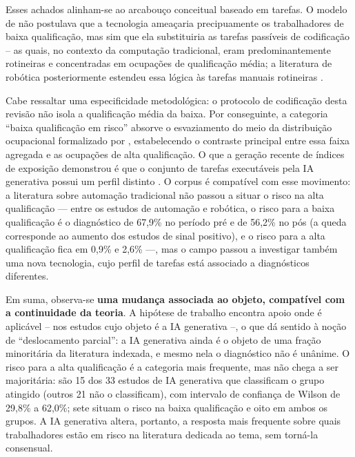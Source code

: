 \begin{table}[htbp]
\centering
\caption{Grupo de qualificação em risco segundo a tecnologia em foco no estudo.}
\label{tab:polarizacao_tecnologia}

\end{table}

Esses achados alinham-se ao arcabouço conceitual baseado em tarefas. O modelo de \textcite{autorLevyMurnane2003} não postulava que a tecnologia ameaçaria precipuamente os trabalhadores de baixa qualificação, mas sim que ela substituiria as tarefas passíveis de codificação -- as quais, no contexto da computação tradicional, eram predominantemente rotineiras e concentradas em ocupações de qualificação média; a literatura de robótica posteriormente estendeu essa lógica às tarefas manuais rotineiras \parencite{acemogluRestrepo2020robots}.

Cabe ressaltar uma especificidade metodológica: o protocolo de codificação desta revisão não isola a qualificação média da baixa. Por conseguinte, a categoria ``baixa qualificação em risco'' absorve o esvaziamento do meio da distribuição ocupacional formalizado por \textcite{autorDorn2013}, estabelecendo o contraste principal entre essa faixa agregada e as ocupações de alta qualificação. O que a geração recente de índices de exposição demonstrou é que o conjunto de tarefas executáveis pela IA generativa possui um perfil distinto \parencite{webb2020, felten2021, eloundou2024}. O corpus é compatível com esse movimento: a literatura sobre automação tradicional não passou a situar o risco na alta qualificação — entre os estudos de automação e robótica, o risco para a baixa qualificação é o diagnóstico de 67,9\% no período pré e de 56,2\% no pós (a queda corresponde ao aumento dos estudos de sinal positivo), e o risco para a alta qualificação fica em 0,9\% e 2,6\% —, mas o campo passou a investigar também uma nova tecnologia, cujo perfil de tarefas está associado a diagnósticos diferentes.

Em suma, observa-se \textbf{uma mudança associada ao objeto, compatível com a continuidade da teoria}. A hipótese de trabalho encontra apoio onde é aplicável -- nos estudos cujo objeto é a IA generativa --, o que dá sentido à noção de ``deslocamento parcial'': a IA generativa ainda é o objeto de uma fração minoritária da literatura indexada, e mesmo nela o diagnóstico não é unânime. O risco para a alta qualificação é a categoria mais frequente, mas não chega a ser majoritária: são 15 dos 33 estudos de IA generativa que classificam o grupo atingido (outros 21 não o classificam), com intervalo de confiança de Wilson de 29,8\% a 62,0\%; sete situam o risco na baixa qualificação e oito em ambos os grupos. A IA generativa altera, portanto, a resposta mais frequente sobre quais trabalhadores estão em risco na literatura dedicada ao tema, sem torná-la consensual.

